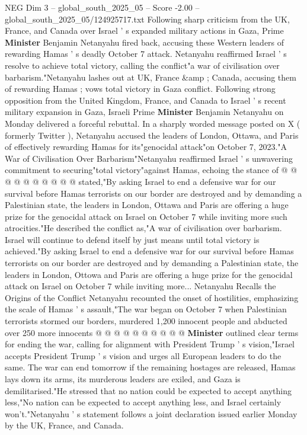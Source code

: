 \begin{textsample}{NEG Dim 3 – global\_south\_2025\_05 – Score -2.00 – global\_south\_2025\_05/124925717.txt}  \label{ex:f3_neg_179}
Following sharp criticism from the UK, France, and Canada over Israel ' s expanded military actions in Gaza, Prime \textbf{Minister} Benjamin Netanyahu fired back, accusing these Western leaders of rewarding Hamas ' s deadly October 7 attack.
Netanyahu reaffirmed Israel ' s resolve to achieve total victory, calling the conflict"a war of civilisation over barbarism."Netanyahu lashes out at UK, France \&amp ; Canada, accusing them of rewarding Hamas ; vows total victory in Gaza conflict.
Following strong opposition from the United Kingdom, France, and Canada to Israel ' s recent military expansion in Gaza, Israeli Prime \textbf{Minister} Benjamin Netanyahu on Monday delivered a forceful rebuttal.
In a sharply worded message posted on X ( formerly Twitter ), Netanyahu accused the leaders of London, Ottawa, and Paris of effectively rewarding Hamas for its"genocidal attack"on October 7, 2023."A War of Civilisation Over Barbarism"Netanyahu reaffirmed Israel ' s unwavering commitment to securing"total victory"against Hamas, echoing the stance of @ @ @ @ @ @ @ @ @ @ stated,"By asking Israel to end a defensive war for our survival before Hamas terrorists on our border are destroyed and by demanding a Palestinian state, the leaders in London, Ottawa and Paris are offering a huge prize for the genocidal attack on Israel on October 7 while inviting more such atrocities."He described the conflict as,"A war of civilisation over barbarism.
Israel will continue to defend itself by just means until total victory is achieved."By asking Israel to end a defensive war for our survival before Hamas terrorists on our border are destroyed and by demanding a Palestinian state, the leaders in London, Ottowa and Paris are offering a huge prize for the genocidal attack on Israel on October 7 while inviting more...
Netanyahu Recalls the Origins of the Conflict Netanyahu recounted the onset of hostilities, emphasizing the scale of Hamas ' s assault,"The war began on October 7 when Palestinian terrorists stormed our borders, murdered 1,200 innocent people and abducted over 250 more innocents @ @ @ @ @ @ @ @ @ @ \textbf{Minister} outlined clear terms for ending the war, calling for alignment with President Trump ' s vision,"Israel accepts President Trump ' s vision and urges all European leaders to do the same.
The war can end tomorrow if the remaining hostages are released, Hamas lays down its arms, its murderous leaders are exiled, and Gaza is demilitarised."He stressed that no nation could be expected to accept anything less,"No nation can be expected to accept anything less, and Israel certainly won't."Netanyahu ' s statement follows a joint declaration issued earlier Monday by the UK, France, and Canada.

\end{textsample}

